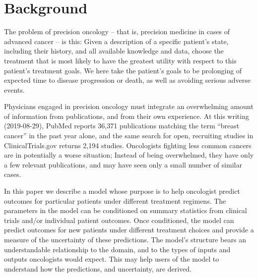 \documentclass[twocolumn]{bmcart}%
\begin{document}

\section{Background}\label{sec:background}

The problem of precision oncology -- that is, precision medicine in cases of
advanced cancer -- is this: Given a description of a specific patient's state,
including their history, and all available knowledge and data, choose the
treatment that is most likely to have the greatest utility with respect to this
patient's treatment goals. We here take the patient's goals to be prolonging of
expected time to disease progression or death, as well as avoiding serious
adverse events.

Physicians engaged in precision oncology must integrate an overwhelming amount
of information from publications, and from their own experience. At this
writing (2019-08-29), PubMed reports 36,371 publications matching the term
``breast cancer'' in the past year alone, and the same search for open,
recruiting studies in ClinicalTrials.gov returns 2,194 studies. Oncologists
fighting less common cancers are in potentially a worse situation; Instead of
being overwhelmed, they have only a few relevant publications, and may have
seen only a small number of similar cases.

In this paper we describe a model whose purpose is to help oncologist predict
outcomes for particular patients under different treatment regimens. The
parameters in the model can be conditioned on summary statistics from clinical
trials and/or individual patient outcomes. Once conditioned, the model can
predict outcomes for new patients under different treatment choices and provide
a measure of the uncertainty of these predictions. The model's structure bears
an understandable relationship to the domain, and to the types of inputs and
outputs oncologists would expect. This may help users of the model to
understand how the predictions, and uncertainty, are derived.
\end{document}
